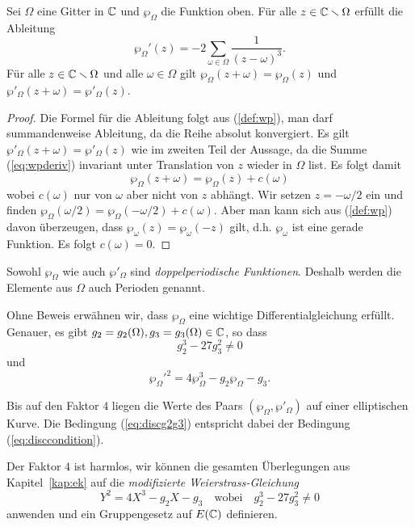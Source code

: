 \begin{lemma}
  Sei $\Omega$ eine Gitter in ${\mathbb{C}}$ und $\wp_\Omega$ die Funktion
  oben. Für alle $z\in{\mathbb{C}}\smallsetminus\Omega$ erfüllt die Ableitung
  \begin{equation}
    \label{eq:wpderiv}
    \wp_\Omega'(z) = -2 \sum_{\omega\in\Omega} \frac{1}{(z-\omega)^3}.
  \end{equation}
  Für alle $z\in{\mathbb{C}}\smallsetminus\Omega$ und alle  $\omega\in\Omega$
  gilt $\wp_\Omega(z+\omega) = \wp_\Omega(z)$ und
  $\wp'_\Omega(z+\omega) = \wp'_\Omega(z)$.
\end{lemma}
\begin{proof}
  Die Formel für die Ableitung folgt aus (\ref{def:wp}), man darf
  summandenweise Ableitung, da die Reihe absolut konvergiert. Es gilt
  $\wp'_\Omega(z+\omega) = \wp'_\Omega(z)$ wie im zweiten Teil der
  Aussage, da die Summe (\ref{eq:wpderiv}) invariant unter Translation
  von $z$ wieder in $\Omega$ list. 
  Es folgt damit
  $$
  \wp_\Omega(z+\omega) = \wp_\Omega(z) + c(\omega)
  $$
  wobei $c(\omega)$ nur von $\omega$ aber nicht von $z$ abhängt.
  Wir setzen $z=-\omega/2$ ein und finden
  $\wp_\Omega(\omega/2) = \wp_\Omega(-\omega/2) + c(\omega)$.
  Aber man kann sich aus (\ref{def:wp}) davon überzeugen, dass
  $\wp_\omega(z)=\wp_\omega(-z)$ gilt, d.h. $\wp_\omega$ ist eine
  gerade Funktion. Es folgt $c(\omega)=0$. 
\end{proof}

\begin{bemerkung}
  Sowohl $\wp_\Omega$ wie auch $\wp'_\Omega$ sind \emph{doppelperiodische
    Funktionen}. Deshalb werden die Elemente aus $\Omega$ auch
  Perioden genannt. 
\end{bemerkung}

Ohne Beweis erwähnen wir, dass $\wp_\Omega$ eine wichtige
Differentialgleichung erfüllt. Genauer, es gibt $g_2=g_2(\Omega),g_3=g_3(\Omega)\in{\mathbb{C}}$, so
dass
\begin{equation}
  \label{eq:discg2g3}
  g_2^3-27g_3^2 \not=0
\end{equation}
und 
\begin{equation}
  \label{eq:weierstrassdgl}
  {\wp_\Omega'}^2  = 4 \wp_\Omega^3 - g_2\wp_\Omega - g_3.  
\end{equation}


Bis auf den Faktor $4$ liegen die Werte des Paars
$(\wp_\Omega,\wp'_\Omega)$ auf einer elliptischen Kurve. 
Die Bedingung (\ref{eq:discg2g3}) entspricht dabei der Bedingung
(\ref{eq:disccondition}).

Der Faktor $4$ ist harmlos, wir können die gesamten Überlegungen aus
Kapitel~\ref{kap:ek} auf die \emph{modifizierte Weierstrass-Gleichung}
\begin{equation}
  \label{eq:modweierstrass}
  Y^2 = 4X^3-g_2X-g_3 \quad\text{wobei}\quad   g_2^3-27g_3^2 \not=0
\end{equation}
anwenden und ein Gruppengesetz auf $E({\mathbb{C}})$ definieren.

